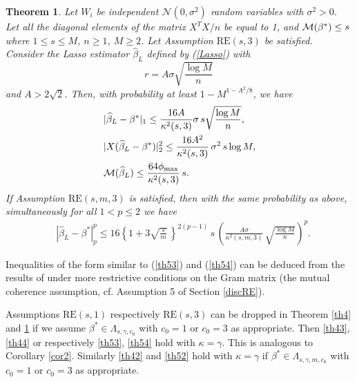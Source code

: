 \documentclass[dvips,aos]{imsart}
\numberwithin{equation}{section}
\theoremstyle{plain}
\newtheorem{thm}{Theorem}[section]%
\def\scm{{\cal M}}
\def\RE#1#2{$\text{RE}(#1,#2)$}
\def\REm#1#2#3{$\text{RE}(#1,#2,#3)$}
\newcommand{\bb}{\mbox{\boldmath$\beta$}}
\def\bb{\beta}
\begin{document}
\begin{thm}\label{th5}
Let  $W_i$ be independent ${\mathcal N}(0,\sigma^2)$ random
variables with $\sigma^2>0$. Let all the diagonal elements of the
matrix $X^TX/n$ be equal to 1, and $\scm(\bb^*)\le s$ where $1\le s
\le M$, $n\ge1$, $M\ge2$. Let Assumption \RE s3 be satisfied.
Consider the Lasso estimator $\widehat \bb_L$ defined by
(\ref{Lasso}) with
$$
r= A\sigma \sqrt{\frac{\log M}{n}}\,
$$
and $A>2\sqrt{2}$. Then, with probability at least $1-M^{1-A^2/8}$,
we have
\begin{align}
\label{th53} &|\widehat\bb_L-\bb^*|_1 \le \frac{16A}{\kappa^2(s,3)}
\sigma \, s \sqrt{\frac{\log M}{n}},\\
%
\label{th54} &|X(\widehat\bb_L-\bb^*)|_2^2 \le
\frac{16A^2}{\kappa^2(s,3)}\, \sigma^2\, s\log M,
\\
%
\label{th55} &\scm(\widehat\bb_L) \le \frac{64 \phi_{\max}}{\kappa^2(s,3)}\,s.
\end{align}
If Assumption \REm sm3 is satisfied, then with the same probability
as above, simultaneously for all $1<p\le2$ we have
\begin{equation}\begin{split}
\label{th52} &|\widehat\bb_L-\bb^*|_p^p \le 16
\left\{1+3\sqrt{\frac{s}{m}}\,\right\}^{2(p-1)}\, s\,\left(
\frac{A\sigma }{\kappa^2(s,m,3)}\, \sqrt{\frac{ \log M}{n}}\right)^p.
\end{split}\end{equation}

\end{thm}




Inequalities of the form similar to (\ref{th53}) and (\ref{th54})
can be deduced from the results of \cite{btw06a} under more
restrictive conditions on the Gram matrix (the mutual coherence
assumption, cf. Assumption 5 of Section \ref{discRE}).


Assumptions \RE s1 respectively \RE s3 can be dropped in
Theorem \ref{th4} and \ref{th5} if we assume $\beta^*\in
\Lambda_{s,\gamma,c_0}$ with $c_0=1$ or $c_0=3$ as appropriate. Then
\eqref{th43}, \eqref{th44} or respectively \eqref{th53},
\eqref{th54} hold with $\kappa=\gamma$. This is analogous to
Corollary \ref{cor2}. Similarly \eqref{th42} and \eqref{th52} hold
with $\kappa=\gamma$ if $\beta^*\in \Lambda_{s, \gamma,m,c_0}$ with
$c_0=1$ or $c_0=3$ as appropriate.
\end{document}
